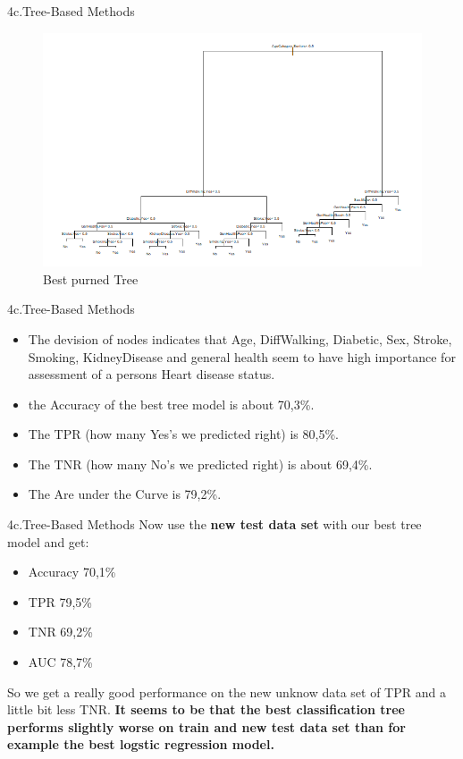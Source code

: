 \documentclass[xcolor=dvipsnames]{beamer}
\begin{document}
\begin{frame}{4c.Tree-Based Methods}
\begin{figure}
    \centering
    \includegraphics[scale= 0.6]{Decision_Tree.png}
    \caption{Best purned Tree}
    \label{fig:my_label}
\end{figure}
\end{frame}

\begin{frame}{4c.Tree-Based Methods}
\begin{itemize}
\item The devision of nodes indicates that Age, DiffWalking, Diabetic, Sex, Stroke, Smoking, KidneyDisease and general health seem to have high importance for assessment of a persons Heart disease status.
\item the Accuracy of the best tree model is about 70,3\%.
\item The TPR (how many Yes's we predicted right) is 80,5\%.
\item  The TNR (how many No's we predicted right) is about 69,4\%. \item The Are under the Curve is 79,2\%.
\end{itemize}
\end{frame}

\begin{frame}{4c.Tree-Based Methods}
Now use the \textbf{new test data set} with our best tree model and get:
\begin{itemize}
\item Accuracy 70,1\%
\item TPR 79,5\%
\item TNR 69,2\%
\item AUC 78,7\%
\end{itemize}
So we get a really good performance on the new unknow data set of TPR and a little bit less TNR. 
\newline \textbf{It seems to be that the best classification tree performs slightly worse on train and new test data set than for example the best logstic regression model.}
\end{frame}
\end{document}
